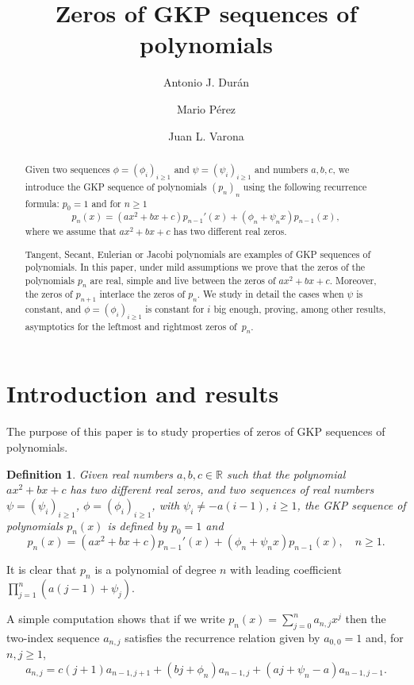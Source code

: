 \documentclass[10pt, a4paper, leqno]{amsart}
\title{Zeros of GKP sequences of polynomials}
\author{Antonio J. Dur\'an}
\author{Mario P\'erez}
\author{Juan L. Varona}
\numberwithin{equation}{section}
\theoremstyle{plain}
\newtheorem{Def}{Definition}[section]
\theoremstyle{remark}
\newcommand{\RR}{\mathbb{R}}
\begin{document}

\begin{abstract}
Given two sequences $\phi=(\phi_i)_{i\ge 1}$ and $\psi=(\psi_i)_{i\ge 1}$ and numbers $a,b,c$, we introduce the GKP sequence of polynomials $(p_n)_n$ using the following recurrence formula:
$p_0 = 1$ and for $n\ge 1$
\[
  p_{n}(x) = (ax^2+bx+c) p_{n-1}'(x) + (\phi_{n} + \psi_{n} x)p_{n-1}(x),
\]
where we assume that $ax^2+bx+c$ has two different real zeros.

Tangent, Secant, Eulerian or Jacobi polynomials are examples of GKP sequences of polynomials. In this paper, under mild assumptions we prove that the zeros of the polynomials $p_n$ are real, simple and live between the zeros of $ax^2+bx+c$. Moreover, the zeros of $p_{n+1}$ interlace the zeros of $p_n$. We study in detail the cases when $\psi$ is constant, and $\phi=(\phi_i)_{i\ge 1}$ is constant for $i$ big enough, proving, among other results, asymptotics for the leftmost and rightmost zeros of~$p_n$.
\end{abstract}

\maketitle

\section{Introduction and results}

The purpose of this paper is to study properties of zeros of GKP sequences of polynomials.

\begin{Def}
Given real numbers $a,b,c\in \RR$ such that the polynomial $ax^2+bx+c$ has two different real zeros, and two sequences of real numbers
$\psi= (\psi_i)_{i \ge 1}$, $\phi = (\phi_i)_{i \ge 1}$,
with $\psi_{i} \ne -a(i-1)$, $i\ge 1$, the GKP sequence of polynomials
$p_n(x)$ is defined by $p_0 = 1$ and
\begin{equation}
\label{sn+1i}
  p_{n}(x) = (ax^2+bx+c) p_{n-1}'(x) + (\phi_{n} + \psi_{n} x)p_{n-1}(x), \quad n \ge 1.
\end{equation}
\end{Def}

It is clear that $p_n$ is a polynomial of degree $n$ with leading coefficient $\prod_{j=1}^n (a(j-1)+\psi_{j})$.

A simple computation shows that if we write $p_n(x) = \sum_{j=0}^n a_{n,j}x^j$ then the two-index sequence $a_{n,j}$ satisfies the recurrence relation given by $a_{0,0}=1$ and, for $n,j\ge 1$,
\begin{equation}
\label{gkp1}
  a_{n,j} = c(j+1)a_{n-1,j+1}+(bj+\phi_n)a_{n-1,j}+(aj+\psi_n-a)a_{n-1,j-1}.
\end{equation}
\end{document}
